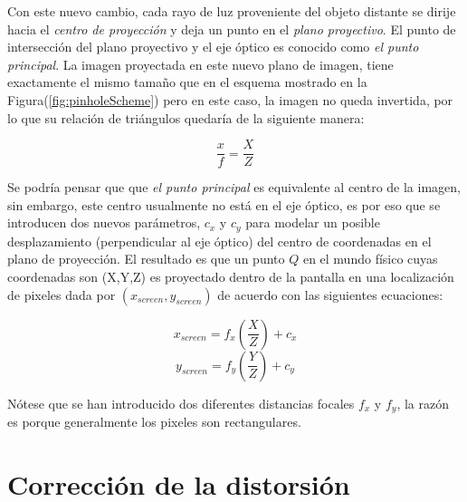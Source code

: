 Con este nuevo cambio, cada rayo de luz proveniente del objeto distante se dirije hacia el \textit{centro de proyección} y deja un punto en el \textit{plano proyectivo}. El punto de intersección del plano proyectivo y el eje óptico es conocido como \textit{el punto principal}. La imagen proyectada en este nuevo plano de imagen, tiene exactamente el mismo tamaño que en el esquema mostrado en la Figura(\ref{fig:pinholeScheme}) pero en este caso, la imagen no queda invertida, por lo que su relación de triángulos quedaría de la siguiente manera: 

\[\frac{x}{f} = \frac{X}{Z}\]

Se podría pensar que que \textit{el punto principal} es equivalente al centro de la imagen, sin embargo, este centro usualmente no está en el eje óptico, es por eso que se introducen dos nuevos parámetros, $c_{x}$ y $c_{y}$ para modelar un posible desplazamiento (perpendicular al eje óptico) del centro de coordenadas en el plano de proyección. El resultado es que un punto $Q$ en el mundo físico cuyas coordenadas son  (X,Y,Z) es proyectado dentro de la pantalla en una localización de pixeles dada por $(x_{screen},y_{screen})$ de acuerdo con las siguientes ecuaciones:

\[x_{screen}=f_{x}\left(\frac{X}{Z}\right ) + c_{x}\]	
\[y_{screen}=f_{y}\left(\frac{Y}{Z}\right ) + c_{y}\]

Nótese que se han introducido dos diferentes distancias focales $f_{x}$ y $f_{y}$, la razón es porque generalmente los pixeles son rectangulares.
		
	\section{Corrección de la distorsión}
